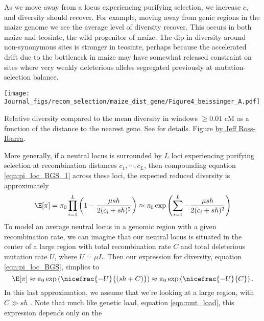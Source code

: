 As we move away from a locus experiencing purifying selection, 
we increase $c$, and diversity should recover. For example, moving away
from genic regions in the maize genome we see the average level of
diversity recover. This occurs in both maize and teosinte, the wild
progenitor of maize. The dip in diversity around non-synonymous sites is stronger in teosinte, perhaps because the accelerated drift due to the
bottleneck in maize
may have somewhat released constraint on sites where very weakly deleterious
alleles segregated previously at mutation-selection balance. 
\begin{marginfigure}
\begin{center}
\texttt{[image: Journal\_figs/recom\_selection/maize\_dist\_gene/Figure4\_beissinger\_A.pdf]}
\end{center}
\caption{Relative diversity compared to the mean diversity in windows
  $\ge 0.01$ cM as a function of the distance to the nearest gene.
  See \citep{beissinger2016recent} for details. Figure \PLOSccBY
   \href{https://github.com/RILAB/beissinger_ms}{ by Jeff Ross-Ibarra}.} \label{fig:BGS_maize}
\end{marginfigure}
More generally, if a neutral locus is surrounded by $L$ loci
experiencing purifying selection at recombination distances
$c_1,\cdots,c_L$, then compounding equation \eqref{eqn:pi_loc_BGS_1}
across these loci, the expected reduced diversity is approximately
\begin{equation}
\E[\pi] = \pi_0  \prod_{i=1}^L \left(1-\frac{\mu sh}{2(c_i+sh)^2}
\right) \approx \pi_0 \exp \left( \sum_{i=1}^L - \frac{\mu sh}{2(c_i+sh)^2} \right) \label{eqn:pi_loc_BGS}
\end{equation}
To model an average neutral locus in a genomic region with a given recombination rate, we can imagine that our neutral locus is situated in the center of a large region with
total recombination rate $C$ and total deleterious mutation rate $U$,
where $U = \mu L$. Then our expression for diversity, equation \eqref{eqn:pi_loc_BGS}, simplies to 
\begin{equation}
\E[\pi] \approx \pi_0 \exp \left( \nicefrac{-U}{(sh+C)} \right)
\approx \pi_0 \exp \left( \nicefrac{-U}{C} \right). \label{eqn:GW_BGS_1}
\end{equation}
In this last approximation, we assume that we're looking at a
large region, with $C \gg sh$ . Note that much like genetic load,
equation \eqref{eqn:mut_load}, this expression depends only on the

